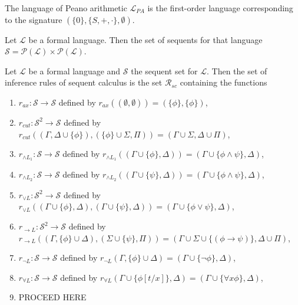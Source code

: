 \begin{definition}\label{def:LPA}
    The language of Peano arithmetic $\mathcal{L}_{PA}$ is the first-order language corresponding to the signature $(\{0\},\{S,+,\cdot\},\emptyset)$.
\end{definition} 

\begin{definition}\label{def:sequent-set}
    Let $\mathcal{L}$ be a formal language. Then the set of sequents for that language $\mathcal{S} = \mathcal{P}(\mathcal{L}) \times \mathcal{P}(\mathcal{L})$.
\end{definition}

\begin{definition}\label{def:Rsc}
    Let $\mathcal{L}$ be a formal language and $\mathcal{S}$ the sequent set for $\mathcal{L}$. Then the set of inference rules of sequent calculus is the set $\mathcal{R}_{sc}$ containing the functions
    \begin{enumerate}
        \item $r_{ax} : \mathcal{S} \to \mathcal{S}$ defined by $r_{ax}((\emptyset,\emptyset)) = (\{\phi\},\{\phi\})$,
        \item $r_{cut} : \mathcal{S}^2 \to \mathcal{S}$ defined by $r_{cut}((\Gamma,\Delta \cup \{\phi\}),(\{\phi\} \cup \Sigma,\Pi))=(\Gamma \cup \Sigma, \Delta \cup \Pi)$,
        \item $r_{\land L_1} : \mathcal{S} \to \mathcal{S}$ defined by $r_{\land L_1}((\Gamma \cup \{\phi\}, \Delta))=(\Gamma \cup \{\phi \land \psi\}, \Delta)$,
        \item $r_{\land L_2} : \mathcal{S} \to \mathcal{S}$ defined by $r_{\land L_2}((\Gamma \cup \{\psi\}, \Delta))=(\Gamma \cup \{\phi \land \psi\}, \Delta)$,
        \item $r_{\lor L} : \mathcal{S}^2 \to \mathcal{S}$ defined by $r_{\lor L}((\Gamma \cup \{\phi\},\Delta),(\Gamma \cup \{\psi\},\Delta))=(\Gamma \cup \{\phi \lor \psi\},\Delta)$,
        \item $r_{\to L} : \mathcal{S}^2 \to \mathcal{S}$ defined by $r_{\to L}((\Gamma, \{\phi\} \cup \Delta),(\Sigma \cup \{\psi\},\Pi))=(\Gamma \cup \Sigma \cup \{(\phi \to \psi)\},\Delta \cup \Pi)$,
        \item $r_{\neg L} : \mathcal{S} \to \mathcal{S}$ defined by $r_{\neg L}(\Gamma,\{\phi\} \cup \Delta)=(\Gamma \cup \{\neg \phi\},\Delta)$,
        \item $r_{\forall L} : \mathcal{S} \to \mathcal{S}$ defined by $r_{\forall L}(\Gamma \cup \{\phi [t/x]\},\Delta)=(\Gamma \cup \{ \forall x \phi \},\Delta)$,
        \item PROCEED HERE
    \end{enumerate}
\end{definition}

